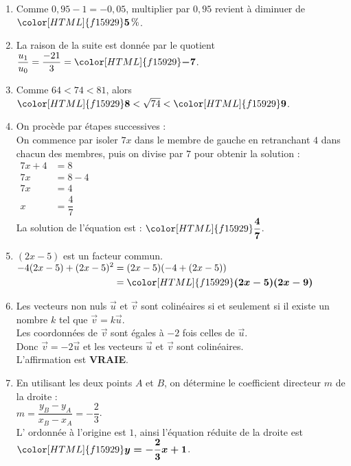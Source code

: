 \documentclass[a4paper,11pt,landscape,exos]{nsi} %
\begin{document}
\begin{multicols}{2}
\begin{enumerate}[]
\item Comme $0{,}95-1=-0{,}05$, multiplier par $0{,}95$ revient à diminuer de ${\color[HTML]{f15929}\boldsymbol{5}}\,\%$. 
\item La raison de la suite est donnée par le quotient $\dfrac{u_1}{u_0}=\dfrac{-21}{3}={\color[HTML]{f15929}\boldsymbol{-7}}$.
\item Comme $64 < 74 < 81$, alors 
    ${\color[HTML]{f15929}\boldsymbol{8}} < \sqrt{74} < {\color[HTML]{f15929}\boldsymbol{9}}$.
\item On procède par étapes successives :\\
      On commence par isoler $7x$ dans le membre de gauche en retranchant
      $4$ dans chacun des membres, puis on divise
      par $7$ pour obtenir la solution : \\
       $\begin{aligned}
       7x+4&=8\\
      7x&=8-4\\
      7x&=4\\
      x&=\dfrac{4}{7}    
      \end{aligned}$\\
      La solution de l'équation est : ${\color[HTML]{f15929}\boldsymbol{\dfrac{4}{7}}}$.
      
\item $(2x-5)$ est un facteur commun.\\
      $\begin{aligned}
      -4(2x-5)+(2x-5)^2
      &=(2x-5)(-4+(2x-5))\\
      &={\color[HTML]{f15929}\boldsymbol{(2x-5)(2x-9)}}\end{aligned}$
\item  Les vecteurs non nuls $\vec{u}$ et $\vec{v}$ sont colinéaires si et seulement si il existe un nombre $k$ tel que $\vec{v}=k\vec{u}$.\\
    Les coordonnées de $\vec{v}$ sont égales à $-2$ fois celles de $\vec{u}$.\\
    Donc $\vec{v}=-2\vec{u}$ et les vecteurs $\vec{u}$ et $\vec{v}$ sont colinéaires.\\
    L'affirmation est {\bfseries \color[HTML]{f15929}VRAIE}.
\item En utilisant les deux points $A$ et $B$, on détermine le coefficient directeur $m$ de la droite : \\
    $m=\dfrac{y_B-y_A}{x_B-x_A}=-\dfrac{2}{3}$.\\
         L' ordonnée à l'origine est $1$, ainsi l'équation réduite de la droite est ${\color[HTML]{f15929}\boldsymbol{y=-\dfrac{2}{3}x+1}}$.


\end{enumerate}
\end{multicols}
\end{document}
